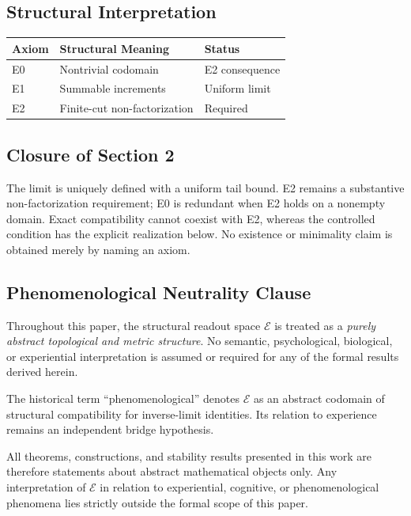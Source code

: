 \subsection{Structural Interpretation}

\begin{center}
\begin{tabular}{|l|l|l|}
\hline
\textbf{Axiom} & \textbf{Structural Meaning} & \textbf{Status} \\
\hline
E0 & Nontrivial codomain & E2 consequence \\
\hline
E1 & Summable increments & Uniform limit \\
\hline
E2 & Finite-cut non-factorization & Required \\
\hline
\end{tabular}
\end{center}

\subsection{Closure of Section 2}
The limit is uniquely defined with a uniform tail bound. E2 remains a substantive non-factorization requirement; E0 is redundant when E2 holds on a nonempty domain. Exact compatibility cannot coexist with E2, whereas the controlled condition has the explicit realization below. No existence or minimality claim is obtained merely by naming an axiom.

\subsection{Phenomenological Neutrality Clause}

Throughout this paper, the structural readout space $\mathcal{E}$ is treated as a \textit{purely abstract topological and metric structure}. No semantic, psychological, biological, or experiential interpretation is assumed or required for any of the formal results derived herein.

The historical term ``phenomenological'' denotes $\mathcal{E}$ as an abstract codomain of structural compatibility for inverse-limit identities. Its relation to experience remains an independent bridge hypothesis.

All theorems, constructions, and stability results presented in this work are therefore statements about abstract mathematical objects only. Any interpretation of $\mathcal{E}$ in relation to experiential, cognitive, or phenomenological phenomena lies strictly outside the formal scope of this paper.

